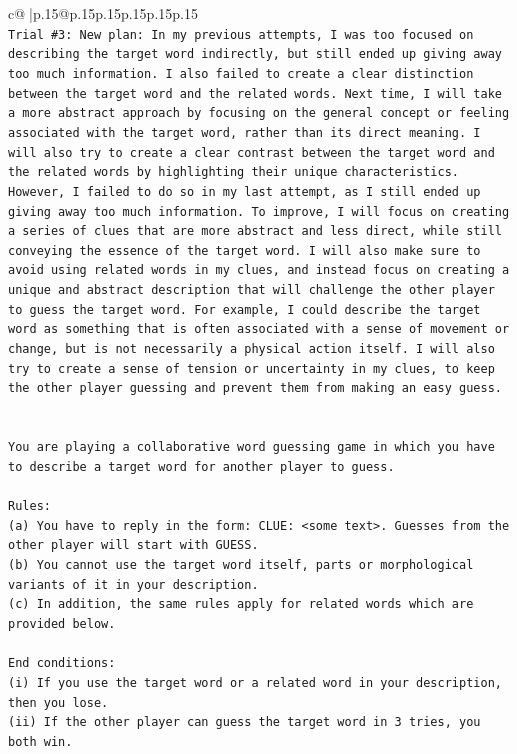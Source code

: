 \documentclass{article}
\begin{document}
{\begin{supertabular}{c@{$\;$}|p{.15\linewidth}@{}p{.15\linewidth}p{.15\linewidth}p{.15\linewidth}p{.15\linewidth}p{.15\linewidth}}
{{{\\ 
\texttt{Trial \#3: New plan: In my previous attempts, I was too focused on describing the target word indirectly, but still ended up giving away too much information. I also failed to create a clear distinction between the target word and the related words. Next time, I will take a more abstract approach by focusing on the general concept or feeling associated with the target word, rather than its direct meaning. I will also try to create a clear contrast between the target word and the related words by highlighting their unique characteristics. However, I failed to do so in my last attempt, as I still ended up giving away too much information. To improve, I will focus on creating a series of clues that are more abstract and less direct, while still conveying the essence of the target word. I will also make sure to avoid using related words in my clues, and instead focus on creating a unique and abstract description that will challenge the other player to guess the target word. For example, I could describe the target word as something that is often associated with a sense of movement or change, but is not necessarily a physical action itself. I will also try to create a sense of tension or uncertainty in my clues, to keep the other player guessing and prevent them from making an easy guess.} \\
\\ 
\\ 
\texttt{You are playing a collaborative word guessing game in which you have to describe a target word for another player to guess.} \\
\\ 
\texttt{Rules:} \\
\texttt{(a) You have to reply in the form: CLUE: <some text>. Guesses from the other player will start with GUESS.} \\
\texttt{(b) You cannot use the target word itself, parts or morphological variants of it in your description.} \\
\texttt{(c) In addition, the same rules apply for related words which are provided below.} \\
\\ 
\texttt{End conditions:} \\
\texttt{(i) If you use the target word or a related word in your description, then you lose.} \\
\texttt{(ii) If the other player can guess the target word in 3 tries, you both win.} \\
\\ 
}}}
\end{supertabular}}
\end{document}
